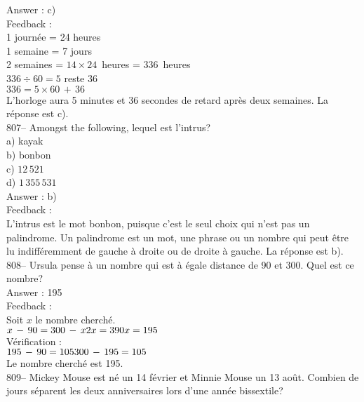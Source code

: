 \documentclass[letterpaper, 12pt]{article}
\begin{document}
Answer : c)\\

Feedback : \\
1 journ\'ee = 24 heures\\
1 semaine = 7 jours\\
2 semaines = $14\times24$~heures = 336~heures\\
$336\div60=5$ reste 36\\
$336=5\times60\,+\,36$\\
L'horloge aura 5 minutes et 36 secondes de retard apr\`es deux semaines.  La
r\'eponse est c).\\

807-- Amongst the following, lequel est l'intrus?\\
a) kayak\\
b) bonbon\\
c) $12\,521$\\
d) $1\,355\,531$\\

Answer : b)\\

Feedback : \\
L'intrus est le mot bonbon, puisque c'est le seul choix qui n'est pas un
palindrome.  Un palindrome est un mot, une phrase ou un nombre qui peut
\^etre lu indiff\'eremment de gauche \`a droite ou de droite \`a gauche.  La
r\'eponse est b).\\

808-- Ursula pense \`a un nombre qui est \`a \'egale distance de 90 et 300.
Quel est ce nombre?\\

Answer : 195\\

Feedback : \\
Soit $x$ le nombre cherch\'e.\\

$x\,-\,90=300\,-\,x\\
2x=390\\
x=195$\\

V\'erification : \\
$195\,-\,90=105\\
300\,-\,195=105$\\

Le nombre cherch\'e est 195.\\

809-- Mickey Mouse est n\'e un 14 f\'evrier et Minnie Mouse un 13 ao\^ut.
Combien de jours s\'eparent les deux anniversaires lors d'une ann\'ee
bissextile?\\
\end{document}
